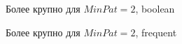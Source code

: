 \documentclass[12pt]{report}
\begin{document}
\begin{figure}[h]
\noindent{}
\caption{ Более крупно для $MinPat=2$, boolean}

\end{figure}
\begin{figure}[h]
\noindent{}
\caption{ Более крупно для $MinPat=2$, frequent}

\end{figure}
\end{document}
